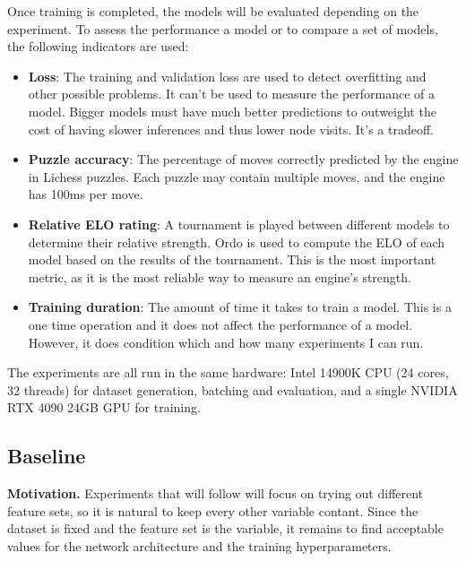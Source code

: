 Once training is completed, the models will be evaluated depending on the experiment. To assess the performance a model or to compare a set of models, the following indicators are used:

\begin{itemize}
\item \textbf{Loss}: The training and validation loss are used to detect overfitting and other possible problems. It can't be used to measure the performance of a model. Bigger models must have much better predictions to outweight the cost of having slower inferences and thus lower node visits. It's a tradeoff.

\item \textbf{Puzzle accuracy}: The percentage of moves correctly predicted by the engine in Lichess puzzles. Each puzzle may contain multiple moves, and the engine has 100ms per move.

\item \textbf{Relative ELO rating}: A tournament is played between different models to determine their relative strength. Ordo is used to compute the ELO of each model based on the results of the tournament. This is the most important metric, as it is the most reliable way to measure an engine's strength.


\item \textbf{Training duration}: The amount of time it takes to train a model. This is a one time operation and it does not affect the performance of a model. However, it does condition which and how many experiments I can run.
\end{itemize}

The experiments are all run in the same hardware: Intel 14900K CPU (24 cores, 32 threads) for dataset generation, batching and evaluation, and a single NVIDIA RTX 4090 24GB GPU for training.

\subsection{Baseline}

\textbf{Motivation.} Experiments that will follow will focus on trying out different feature sets, so it is natural to keep every other variable contant. Since the dataset is fixed and the feature set is the variable, it remains to find acceptable values for the network architecture and the training hyperparameters. 

